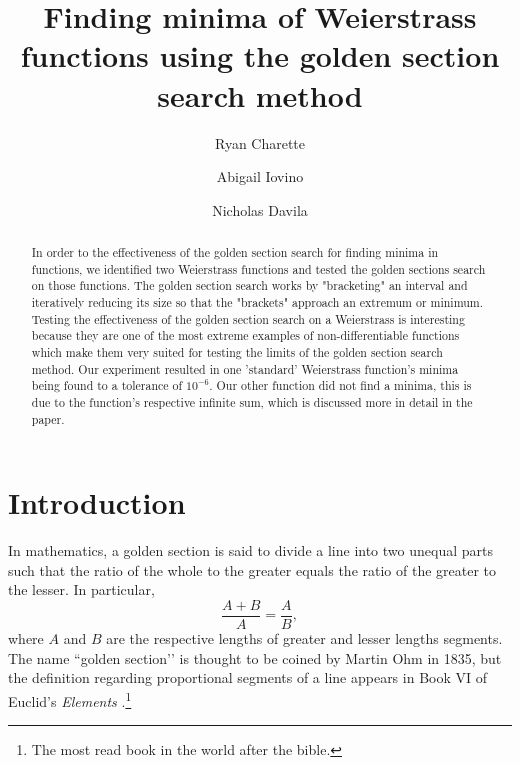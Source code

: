 \documentclass[linenumbers,RNAAS,trackchanges]{aastex631}
\begin{document}
\title{Finding minima of Weierstrass functions using the golden section search method}
\author[0000-0000-0000-0000]{Ryan Charette}
\author[0000-0000-0000-0000]{Abigail Iovino}
\author[0000-0000-0000-0000]{Nicholas Davila}

\begin{abstract}
In order to the effectiveness of the golden section search for finding minima in functions, we identified two Weierstrass functions and tested the golden sections search on those functions. The golden section search works by "bracketing" an interval and iteratively reducing its size so that the "brackets" approach an extremum or minimum. Testing the effectiveness of the golden section search on a Weierstrass is interesting because they are one of the most extreme examples of non-differentiable functions which make them very suited for testing the limits of the golden section search method. Our experiment resulted in one 'standard' Weierstrass function's minima being found to a tolerance of $10^{-6}$. Our other function did not find a minima, this is due to the function's respective infinite sum, which is discussed more in detail in the paper.
\end{abstract}

\section{\textbf{Introduction}} \label{sec:intro}

In mathematics, a golden section is said to divide a line into two unequal parts such that the ratio of the whole to the greater equals the ratio of the greater to the lesser. In particular, 
$$\frac{A+B}{A} = \frac{A}{B},$$ 
where $A$ and $B$ are the respective lengths of greater and lesser lengths segments. The name ``golden section’’ is thought to be coined by Martin Ohm in 1835, but the definition regarding proportional segments of a line appears in Book VI of Euclid’s \textit{Elements} \cite{fowler_1982}.\footnote{The most read book in the world after the bible.} 
\end{document}
